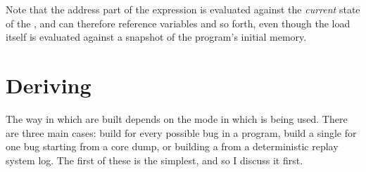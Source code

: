 \begin{itemize}
  Note that the address part of the expression is evaluated against
  the \emph{current} state of the {\StateMachine}, and can therefore
  reference {\StateMachine} variables and so forth, even though the
  load itself is evaluated against a snapshot of the program's initial
  memory.
\end{itemize}


\section{Deriving \StateMachines}


The way in which {\StateMachines} are built depends on the mode in
which {\technique} is being used.  There are three main cases: build
\StateMachines{} for every possible bug in a program, build a single
\StateMachine{} for one bug starting from a core dump, or building a
\StateMachine{} from a deterministic replay system log.  The first of
these is the simplest, and so I discuss it first.

